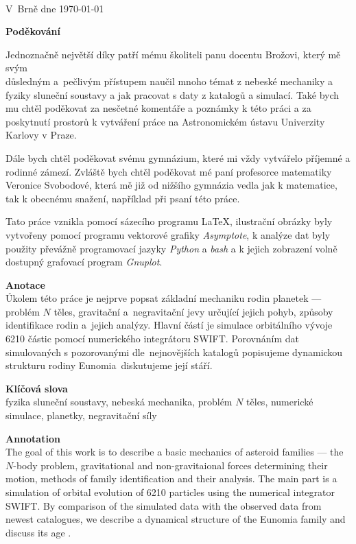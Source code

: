 \documentclass[A4paper, 12pt, oneside]{book}
\begin{document}
\

V~Brně dne \today\ \dotfill \hspace{10mm}

\newpage

{\large \bfseries Poděkování}

Jednoznačně největší díky patří mému školiteli panu docentu Brožovi, který mě svým \\důsledným a~pečlivým přístupem naučil mnoho témat z nebeské mechaniky a fyziky sluneční soustavy a jak pracovat s daty z katalogů a simulací. Také bych mu chtěl poděkovat za nesčetné komentáře a poznámky k této práci a za poskytnutí prostorů k vytváření práce na Astronomickém ústavu Univerzity Karlovy v Praze.

Dále bych chtěl poděkovat svému gymnázium, které mi vždy vytvářelo příjemné a rodinné zámezí. Zvláště bych chtěl poděkovat mé paní profesorce matematiky Veronice Svobodové, která mě již od nižšího gymnázia vedla jak k matematice, tak k obecnému snažení, například při psaní této práce.

Tato práce vznikla pomocí sázecího programu \LaTeX, ilustrační obrázky byly vytvořeny pomocí programu vektorové grafiky \textit{Asymptote}, k analýze dat byly použity převážně programovací jazyky \textit{Python} a \textit{bash} a k jejich zobrazení volně dostupný grafovací program \textit{Gnuplot}.

\newpage

{\large \bfseries Anotace}\\
Úkolem této práce je nejprve popsat základní mechaniku rodin planetek --- problém $N$ těles, gravitační a~negravitační jevy určující jejich pohyb, způsoby identifikace rodin a~jejich analýzy. Hlavní částí je simulace orbitálního vývoje 6210 částic pomocí numerického integrátoru SWIFT. Porovnáním dat simulovaných s pozorovanými dle~nejnovějších katalogů popisujeme dynamickou strukturu rodiny Eunomia~diskutujeme její stáří.

{\large \bfseries Klíčová slova}\\
fyzika sluneční soustavy, nebeská mechanika, problém $N$ těles, numerické simulace, planetky, negravitační síly

\vspace{24pt}

{\large \bfseries Annotation}\\
The goal of this work is to describe a basic mechanics of asteroid families --- the $N$-body problem, gravitational and non-gravitaional forces determining their motion, methods of family identification and their analysis. The main part is a simulation of orbital evolution of 6210 particles using the numerical integrator SWIFT. By comparison of the simulated data with the observed data from newest catalogues, we describe a dynamical structure of the Eunomia family and discuss its age .
\end{document}
